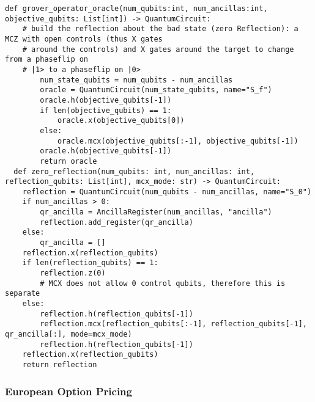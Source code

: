 \documentclass[../../main.tex]{subfiles}
\begin{document}
\begin{lstlisting}[caption={Implementation of reflections for amplitude amplification as used trought the rest of the paper},captionpos=b]
  def grover_operator_oracle(num_qubits:int, num_ancillas:int, objective_qubits: List[int]) -> QuantumCircuit:
    # build the reflection about the bad state (zero Reflection): a MCZ with open controls (thus X gates
    # around the controls) and X gates around the target to change from a phaseflip on
    # |1> to a phaseflip on |0>
        num_state_qubits = num_qubits - num_ancillas
        oracle = QuantumCircuit(num_state_qubits, name="S_f")
        oracle.h(objective_qubits[-1])
        if len(objective_qubits) == 1:
            oracle.x(objective_qubits[0])
        else:
            oracle.mcx(objective_qubits[:-1], objective_qubits[-1])
        oracle.h(objective_qubits[-1])
        return oracle
  def zero_reflection(num_qubits: int, num_ancillas: int, reflection_qubits: List[int], mcx_mode: str) -> QuantumCircuit:
    reflection = QuantumCircuit(num_qubits - num_ancillas, name="S_0")
    if num_ancillas > 0:
        qr_ancilla = AncillaRegister(num_ancillas, "ancilla")
        reflection.add_register(qr_ancilla)
    else:
        qr_ancilla = []
    reflection.x(reflection_qubits)
    if len(reflection_qubits) == 1:
        reflection.z(0)  
        # MCX does not allow 0 control qubits, therefore this is separate
    else:
        reflection.h(reflection_qubits[-1])
        reflection.mcx(reflection_qubits[:-1], reflection_qubits[-1], qr_ancilla[:], mode=mcx_mode)
        reflection.h(reflection_qubits[-1])
    reflection.x(reflection_qubits)
    return reflection
\end{lstlisting}

\subsubsection{European Option Pricing}\label{sec:eurOpPricing}
\end{document}
